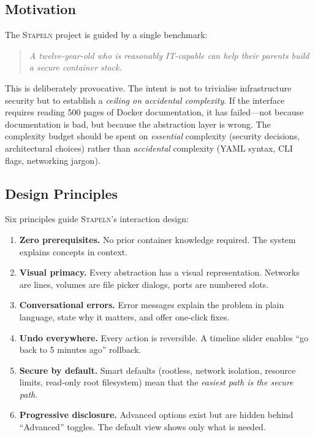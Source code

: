\documentclass[11pt,twocolumn]{article}
\newcommand{\stapeln}{\textsc{Stapeln}\xspace}
\begin{document}
\subsection{Motivation}
\label{sec:acc-motivation}

The \stapeln project is guided by a single benchmark:

\begin{quote}
\emph{A twelve-year-old who is reasonably IT-capable can help their
parents build a secure container stack.}
\end{quote}

This is deliberately provocative. The intent is not to trivialise
infrastructure security but to establish a \emph{ceiling on accidental
complexity}. If the interface requires reading 500 pages of Docker
documentation, it has failed---not because documentation is bad, but
because the abstraction layer is wrong. The complexity budget should
be spent on \emph{essential} complexity (security decisions,
architectural choices) rather than \emph{accidental} complexity
(YAML syntax, CLI flags, networking jargon).

\subsection{Design Principles}
\label{sec:acc-principles}

Six principles guide \stapeln's interaction design:

\begin{enumerate}[leftmargin=*]
\item \textbf{Zero prerequisites.} No prior container knowledge
      required. The system explains concepts in context.
\item \textbf{Visual primacy.} Every abstraction has a visual
      representation. Networks are lines, volumes are file picker
      dialogs, ports are numbered slots.
\item \textbf{Conversational errors.} Error messages explain the
      problem in plain language, state why it matters, and offer
      one-click fixes.
\item \textbf{Undo everywhere.} Every action is reversible. A
      timeline slider enables ``go back to 5 minutes ago'' rollback.
\item \textbf{Secure by default.} Smart defaults (rootless, network
      isolation, resource limits, read-only root filesystem) mean
      that the \emph{easiest path is the secure path}.
\item \textbf{Progressive disclosure.} Advanced options exist but
      are hidden behind ``Advanced'' toggles. The default view shows
      only what is needed.
\end{enumerate}
\end{document}
